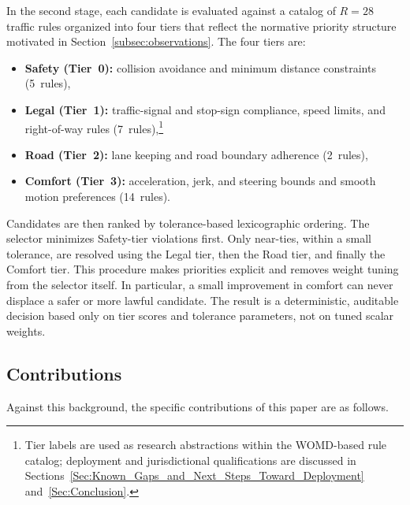 In the second stage, each candidate is evaluated against a catalog of $R{=}28$ traffic rules organized into four tiers that reflect the normative priority structure motivated in Section~\ref{subsec:observations}.  The four tiers are:
\begin{itemize}[leftmargin=1.5em] 

\item \textbf{Safety (Tier~0):} collision avoidance and minimum distance
constraints (5~rules), 

\item \textbf{Legal (Tier~1):} traffic-signal and stop-sign compliance, speed limits, and right-of-way rules (7~rules),\footnote{Tier labels are used as research abstractions within the WOMD-based rule catalog; deployment and jurisdictional qualifications are discussed in Sections~\ref{Sec:Known_Gaps_and_Next_Steps_Toward_Deployment} and~\ref{Sec:Conclusion}.}


\item \textbf{Road (Tier~2):} lane keeping and road boundary adherence
(2~rules), \item \textbf{Comfort (Tier~3):} acceleration, jerk, and steering bounds
and smooth motion preferences (14~rules).

\end{itemize}

\noindent
Candidates are then ranked by tolerance-based lexicographic ordering. The selector minimizes Safety-tier violations first. Only near-ties, within a small tolerance, are resolved using the Legal tier, then the Road tier, and finally the Comfort tier. This procedure makes priorities explicit and removes weight tuning from the selector itself. In particular, a small improvement in comfort can never displace a safer or more lawful candidate. The result is a deterministic, auditable decision based only on tier scores and tolerance parameters, not on tuned scalar weights.

\subsection{Contributions}
\label{subsec:contributions}

Against this background, the specific contributions of this paper are as follows.

